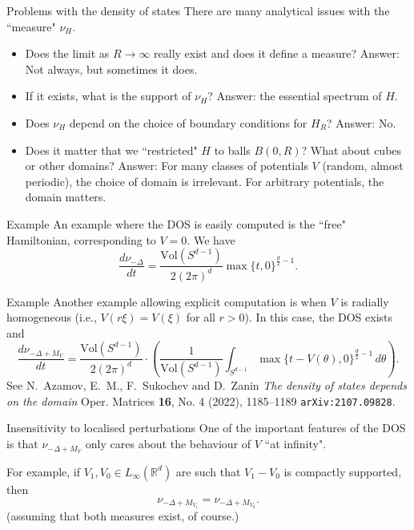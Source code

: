 \documentclass{beamer}
\numberwithin{equation}{section}
\theoremstyle{plain}
\theoremstyle{plain}
\theoremstyle{definition}
\theoremstyle{plain}
\theoremstyle{plain}
\theoremstyle{definition}
\newcommand{\Vol}{\mathrm{Vol}}
\newcommand{\Rl}{\mathbb{R}}
\begin{document}
\begin{frame}{Problems with the density of states}
    There are many analytical issues with the ``measure" $\nu_H$.
    \begin{itemize}
        \item{} Does the limit as $R\to\infty$ really exist and does it define a measure? \pause    Answer: Not always, but sometimes it does. \pause
        \item{} If it exists, what is the support of $\nu_H$? \pause   Answer: the essential spectrum of $H$. \pause
        \item{} Does $\nu_H$ depend on the choice of boundary conditions for $H_R$? \pause   Answer: No. \pause
        \item{} Does it matter that we ``restricted" $H$ to balls $B(0,R)$? What about cubes or other domains? \pause Answer: For many classes of potentials $V$ (random, almost periodic), the choice of domain is irrelevant. For arbitrary potentials, the domain matters.
    \end{itemize}
\end{frame}

\begin{frame}{Example}
    An example where the DOS is easily computed is the ``free" Hamiltonian, corresponding to $V = 0$. We have
    \begin{equation*}
        \frac{d\nu_{-\Delta}}{dt} = \frac{\Vol(S^{d-1})}{2(2\pi)^d}\max\{t,0\}^{\frac{d}{2}-1}.
    \end{equation*}
\end{frame}

\begin{frame}{Example}
    Another example allowing explicit computation is when $V$ is radially homogeneous (i.e., $V(r\xi) = V(\xi)$ for all $r>0$). In this case, the DOS exists and 
    \[
        \frac{d\nu_{-\Delta+M_V}}{dt} = \frac{\Vol(S^{d-1})}{2(2\pi)^d}\cdot \left(\frac{1}{\mathrm{Vol}(S^{d-1})}\int_{S^{d-1}} \max\{t-V(\theta),0\}^{\frac{d}{2}-1}\,d\theta\right).
    \]
    See N.~Azamov, E.~M., F.~Sukochev and D.~Zanin \emph{The density of states depends on the domain} Oper.
Matrices \textbf{16}, No. 4 (2022), 1185--1189 \texttt{arXiv:2107.09828}.
\end{frame}

\begin{frame}{Insensitivity to localised perturbations}
    One of the important features of the DOS is that $\nu_{-\Delta+M_V}$ only cares about the behaviour of $V$ ``at infinity".\pause
    
    For example, if $V_1,V_0 \in L_{\infty}(\Rl^d)$ are such that $V_1-V_0$ is compactly supported, then 
    \[
        \nu_{-\Delta+M_{V_1}}=\nu_{-\Delta+M_{V_0}}.
    \]
    (assuming that both measures exist, of course.)
\end{frame}
\end{document}
